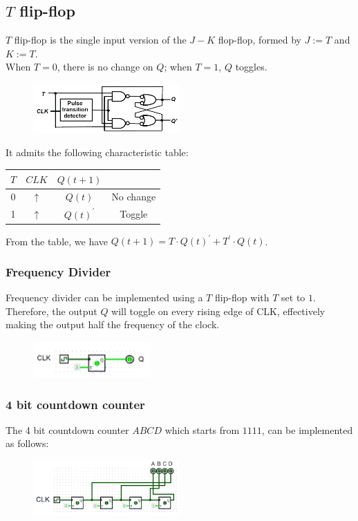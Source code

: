 \documentclass[12pt]{article}
\theoremstyle{definition}
\begin{document}
\subsection{$T$ flip-flop}
$T$ flip-flop is the single input version of the $J-K$ flop-flop, formed by $J:=T$ and $K:=T$.\\
When $T=0$, there is no change on $Q$; when $T=1$, $Q$ toggles.
\begin{figure}[h]
\centering
\includegraphics[width = 0.5\textwidth]{8_7.png}
\end{figure}
\clearpage
It admits the following characteristic table:
\begin{table}[h]
\centering
\begin{tabular}{|c|c|c|c|}
\hline
$T$&$CLK$&$Q(t+1)$&\\\hline
0&$\uparrow$&$Q(t)$&No change\\\hline
1&$\uparrow$&$Q(t)^\prime$&Toggle\\\hline
\end{tabular}
\end{table}
From the table, we have $Q(t+1) = T\cdot Q(t)^\prime +T^\prime\cdot Q(t)$.
\subsubsection{Frequency Divider}
Frequency divider can be implemented using a $T$ flip-flop with $T$ set to $1$. Therefore, the output $Q$ will toggle on every rising edge of CLK, effectively making the output half the frequency of the clock.
\begin{figure}[h]
\centering
\includegraphics[width = 0.4\textwidth]{8_8.png}
\end{figure}
\subsubsection{4 bit countdown counter}
The 4 bit countdown counter $ABCD$ which starts from $1111$, can be implemented as follows:
\begin{figure}[h]
\centering
\includegraphics[width = 0.5\textwidth]{8_9.png}
\end{figure}
\end{document}
